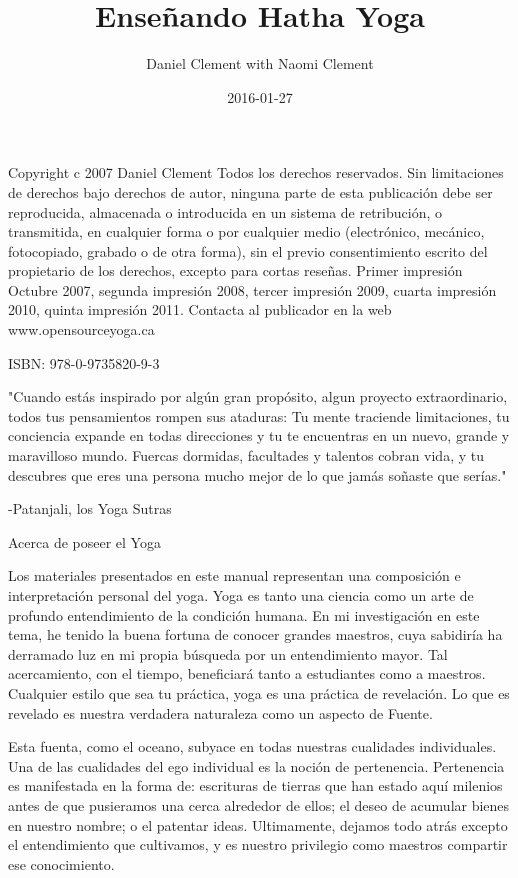 \documentclass[11pt]{book}
\title{Enseñando Hatha Yoga}
\date{2016-01-27}
\author{Daniel Clement with Naomi Clement}
\begin{document}
\maketitle

\frontmatter
Copyright c 2007 Daniel Clement
Todos los derechos reservados. Sin limitaciones de derechos bajo derechos de autor, ninguna parte de esta publicación debe ser reproducida, almacenada o introducida en un sistema de
retribución, o transmitida, en cualquier forma o por cualquier medio (electrónico, mecánico, fotocopiado, grabado o de otra forma), sin el previo consentimiento escrito del propietario de los derechos, excepto para cortas reseñas.
Primer impresión Octubre 2007, segunda impresión 2008, tercer impresión 2009, cuarta impresión 2010, quinta impresión 2011.
Contacta al publicador en la web www.opensourceyoga.ca

ISBN: 978-0-9735820-9-3


\tableofcontents
\newpage



\newpage
"Cuando estás inspirado por algún gran propósito, algun proyecto extraordinario, todos tus pensamientos rompen sus ataduras: Tu mente traciende limitaciones, tu conciencia expande en todas direcciones y tu te encuentras en un nuevo, grande y maravilloso mundo. Fuercas dormidas, facultades y talentos cobran vida, y tu descubres que eres una persona mucho mejor de lo que jamás soñaste que serías."

-Patanjali, los Yoga Sutras


\newpage
Acerca de poseer el Yoga

Los materiales presentados en este manual representan una composición e interpretación personal del yoga. Yoga es tanto una ciencia como un arte de profundo entendimiento de la condición humana. En mi investigación en este tema, he tenido la buena fortuna de conocer grandes maestros, cuya sabidiría ha derramado luz en mi propia búsqueda por un entendimiento mayor. Tal acercamiento, con el tiempo, beneficiará tanto a estudiantes como a maestros. Cualquier estilo que sea tu práctica, yoga es una práctica de revelación. Lo que es revelado es nuestra verdadera naturaleza como un aspecto de Fuente.

Esta fuenta, como el oceano, subyace en todas nuestras cualidades individuales. Una de las cualidades del ego individual es la noción de pertenencia. Pertenencia es manifestada en la forma de: escrituras de tierras que han estado aquí milenios antes de que pusieramos una cerca alrededor de ellos; el deseo de acumular bienes en nuestro nombre; o el patentar ideas. Ultimamente, dejamos todo atrás excepto el entendimiento que cultivamos, y es nuestro privilegio como maestros compartir ese conocimiento.
\end{document}
